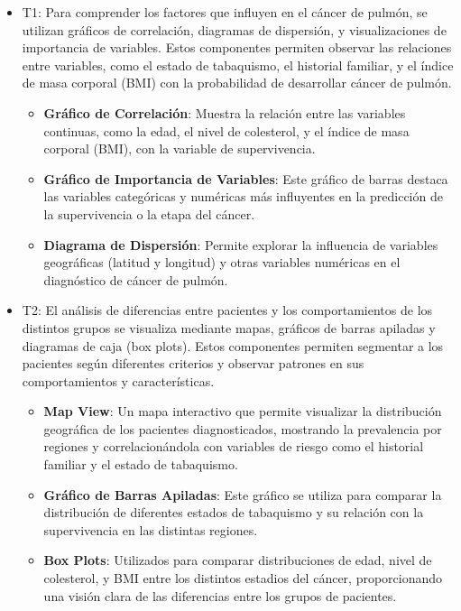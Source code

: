 \documentclass[10pt,journal,compsoc]{IEEEtran}
\begin{document}
\begin{itemize}
\item T1:
Para comprender los factores que influyen en el cáncer de pulmón, se utilizan gráficos de correlación, diagramas de dispersión, y visualizaciones de importancia de variables. Estos componentes permiten observar las relaciones entre variables, como el estado de tabaquismo, el historial familiar, y el índice de masa corporal (BMI) con la probabilidad de desarrollar cáncer de pulmón.

\begin{itemize}
    \item \textbf{Gráfico de Correlación}: Muestra la relación entre las variables continuas, como la edad, el nivel de colesterol, y el índice de masa corporal (BMI), con la variable de supervivencia.
    \item \textbf{Gráfico de Importancia de Variables}: Este gráfico de barras destaca las variables categóricas y numéricas más influyentes en la predicción de la supervivencia o la etapa del cáncer.
    \item \textbf{Diagrama de Dispersión}: Permite explorar la influencia de variables geográficas (latitud y longitud) y otras variables numéricas en el diagnóstico de cáncer de pulmón.
\end{itemize}

\item T2:
El análisis de diferencias entre pacientes y los comportamientos de los distintos grupos se visualiza mediante mapas, gráficos de barras apiladas y diagramas de caja (box plots). Estos componentes permiten segmentar a los pacientes según diferentes criterios y observar patrones en sus comportamientos y características.

\begin{itemize}
    \item \textbf{Map View}: Un mapa interactivo que permite visualizar la distribución geográfica de los pacientes diagnosticados, mostrando la prevalencia por regiones y correlacionándola con variables de riesgo como el historial familiar y el estado de tabaquismo.
    \item \textbf{Gráfico de Barras Apiladas}: Este gráfico se utiliza para comparar la distribución de diferentes estados de tabaquismo y su relación con la supervivencia en las distintas regiones.
    \item \textbf{Box Plots}: Utilizados para comparar distribuciones de edad, nivel de colesterol, y BMI entre los distintos estadios del cáncer, proporcionando una visión clara de las diferencias entre los grupos de pacientes.
\end{itemize}


\end{itemize}
\end{document}
